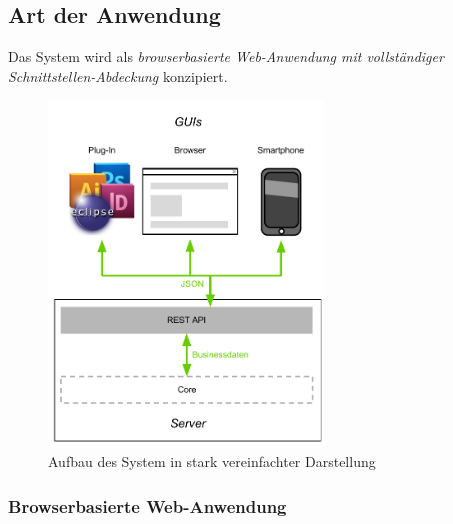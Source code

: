 \subsection{Art der Anwendung}\label{l:loesungsart}

Das System wird als \emph{browserbasierte Web-Anwendung mit vollständiger Schnittstellen-Abdeckung} konzipiert. 

\begin{figure}[htb]
\begin{center}
\includegraphics[width=0.65\textwidth]{media/ArtdesSystems.pdf}
\caption{Aufbau des System in stark vereinfachter Darstellung}
\label{chart:aufbaudessystems}
\end{center}
\end{figure}

\subsubsection{Browserbasierte Web-Anwendung} 


